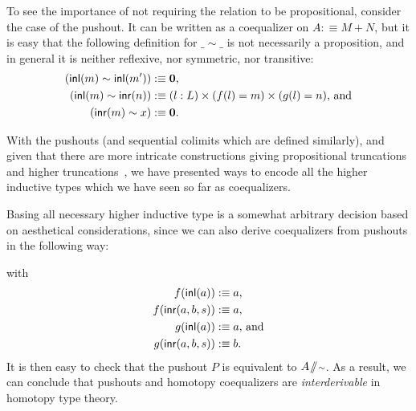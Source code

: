 To see the importance of not requiring the relation to be propositional,
consider the case of the pushout.
It can be written as a coequalizer on $A :\equiv M + N$, but it is easy that the
following definition for $\_\sim\_$ is not necessarily a proposition,
and in general it is neither reflexive, nor symmetric, nor transitive:
\begin{align*}
(\mathsf{inl}(m) \sim \mathsf{inl}(m')) &:\equiv \mathbf{0} \text{,} \\
(\mathsf{inl}(m) \sim \mathsf{inr}(n)) &:\equiv (l : L) \times (f(l) = m) \times (g(l) = n) \text{, and} \\
(\mathsf{inr}(m) \sim x) &:\equiv  \mathbf{0} \text{.}
\end{align*}

With the pushouts (and sequential colimits which are defined similarly),
and given that there are more intricate constructions giving
propositional truncations \citep{floris_proptrunc,kraustrunc} and higher truncations~\citep{rijke:join},
we have presented ways to encode all the higher inductive types
which we have seen so far as coequalizers.

\begin{remark}
Basing all necessary higher inductive type is a somewhat arbitrary decision
based on aesthetical considerations, since we can also derive coequalizers
from pushouts in the following way:
\begin{center}
\end{center}
with
\begin{align*}
f(\mathsf{inl}(a)) &:\equiv a \text{,} \\
f(\mathsf{inr}(a, b, s)) &:\equiv a \text{,} \\
g(\mathsf{inl}(a)) &:\equiv a \text{, and} \\
g(\mathsf{inr}(a, b, s)) &:\equiv b \text{.}
\end{align*}
It is then easy to check that the pushout $P$ is equivalent to $A \! \sslash \! {\scriptstyle \sim}$.
As a result, we can conclude that pushouts and homotopy coequalizers
are \emph{interderivable} in homotopy type theory.
\end{remark}

